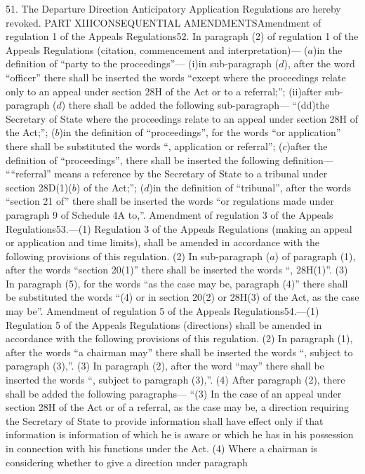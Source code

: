\documentclass[a4paper]{article}
\begin{document}
51. The Departure Direction Anticipatory Application Regulations are
hereby revoked.
PART XIIICONSEQUENTIAL AMENDMENTSAmendment of regulation 1 of the Appeals
Regulations52. In paragraph (2) of regulation 1 of the Appeals Regulations
(citation, commencement and interpretation)—
($a$)in the definition of “party to the proceedings”—
(i)in sub-paragraph ($d$), after the word “officer” there shall be inserted the
words “except where the proceedings relate only to an appeal under section 28H
of the Act or to a referral;”;
(ii)after sub-paragraph ($d$) there shall be added the following sub-paragraph—
“(dd)the Secretary of State where the proceedings relate to an appeal under
section 28H of the Act;”;
($b$)in the definition of “proceedings”, for the words “or application” there
shall be substituted the words “, application or referral”;
($c$)after the definition of “proceedings”, there shall be inserted the following
definition—
““referral” means a reference by the Secretary of State to a tribunal under
section 28D(1)($b$) of the Act;”;
($d$)in the definition of “tribunal”, after the words “section 21 of” there shall
be inserted the words “or regulations made under paragraph 9 of Schedule 4A
to,”.
Amendment of regulation 3 of the Appeals Regulations53.—(1) Regulation 3 of the
Appeals Regulations (making an appeal or application and time limits), shall be
amended in accordance with the following provisions of this regulation.
(2) In sub-paragraph ($a$) of paragraph (1), after the words “section 20(1)” there
shall be inserted the words “, 28H(1)”.
(3) In paragraph (5), for the words “as the case may be, paragraph (4)” there
shall be substituted the words “(4) or in section 20(2) or 28H(3) of the Act, as
the case may be”.
Amendment of regulation 5 of the Appeals Regulations54.—(1) Regulation 5 of the
Appeals Regulations (directions) shall be amended in accordance with the
following provisions of this regulation.
(2) In paragraph (1), after the words “a chairman may” there shall be inserted
the words “, subject to paragraph (3),”.
(3) In paragraph (2), after the word “may” there shall be inserted the words “,
subject to paragraph (3),”.
(4) After paragraph (2), there shall be added the following paragraphs—
“(3) In the case of an appeal under section 28H of the Act or of a referral, as
the case may be, a direction requiring the Secretary of State to provide
information shall have effect only if that information is information of which
he is aware or which he has in his possession in connection with his functions
under the Act.
(4) Where a chairman is considering whether to give a direction under paragraph
\end{document}
